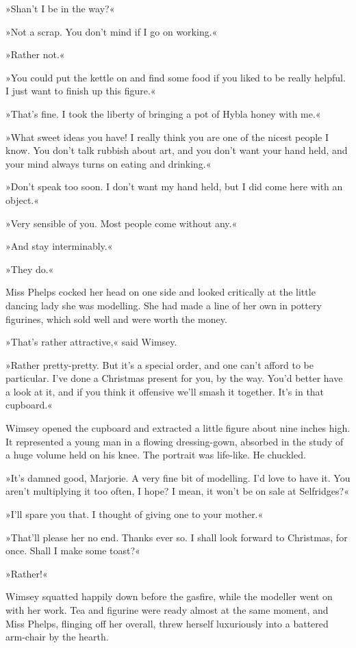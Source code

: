 »Shan't I be in the way?«

»Not a scrap. You don't mind if I go on working.«

»Rather not.«

»You could put the kettle on and find some food if you liked to be really helpful. I just want to finish up this figure.«

»That's fine. I took the liberty of bringing a pot of Hybla honey with me.«

»What sweet ideas you have! I really think you are one of the nicest people I know. You don't talk rubbish about art, and you don't want your hand held, and your mind always turns on eating and drinking.«

»Don't speak too soon. I don't want my hand held, but I did come here with an object.«

»Very sensible of you. Most people come without any.«

»And stay interminably.«

»They do.«

Miss Phelps cocked her head on one side and looked critically at the little dancing lady she was modelling. She had made a line of her own in pottery figurines, which sold well and were worth the money.

»That's rather attractive,« said Wimsey.

»Rather pretty-pretty. But it's a special order, and one can't afford to be particular. I've done a Christmas present for you, by the way. You'd better have a look at it, and if you think it offensive we'll smash it together. It's in that cupboard.«

Wimsey opened the cupboard and extracted a little figure about nine inches high. It represented a young man in a flowing dressing-gown, absorbed in the study of a huge volume held on his knee. The portrait was life-like. He chuckled.

»It's damned good, Marjorie. A very fine bit of modelling. I'd love to have it. You aren't multiplying it too often, I hope? I mean, it won't be on sale at Selfridges?«

»I'll spare you that. I thought of giving one to your mother.«

»That'll please her no end. Thanks ever so. I shall look forward to Christmas, for once. Shall I make some toast?«

»Rather!«

Wimsey squatted happily down before the gasfire, while the modeller went on with her work. Tea and figurine were ready almost at the same moment, and Miss Phelps, flinging off her overall, threw herself luxuriously into a battered arm-chair by the hearth.

